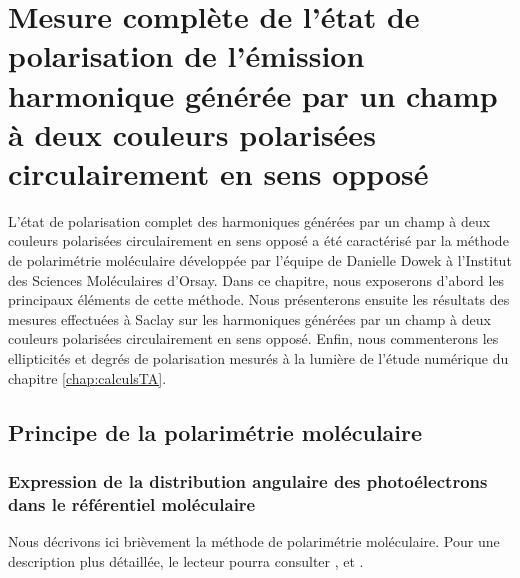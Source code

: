 \chapter{Mesure complète de l'état de polarisation de l'émission harmonique générée par un champ à deux couleurs polarisées circulairement en sens opposé} 
\label{chap:MesurePolar}
L'état de polarisation complet des harmoniques générées par un champ à deux couleurs polarisées circulairement en sens opposé a été caractérisé par la méthode de polarimétrie moléculaire développée par l'équipe de Danielle Dowek à l'Institut des Sciences Moléculaires d'Orsay. Dans ce chapitre, nous exposerons d'abord les principaux éléments de cette méthode. Nous présenterons ensuite les résultats des mesures effectuées à Saclay sur les harmoniques générées par un champ à deux couleurs polarisées circulairement en sens opposé. Enfin, nous commenterons les ellipticités et degrés de polarisation mesurés à la lumière de l'étude numérique du chapitre \ref{chap:calculsTA}.

\section{Principe de la polarimétrie moléculaire}
\subsection{Expression de la distribution angulaire des photoélectrons dans le référentiel moléculaire}
Nous décrivons ici brièvement la méthode de polarimétrie moléculaire. Pour une description plus détaillée, le lecteur pourra consulter ,  et .

